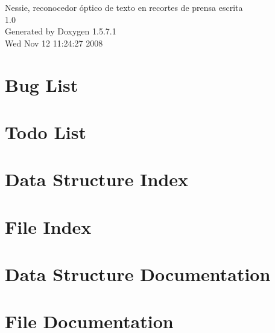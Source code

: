 \documentclass[a4paper]{article}
\begin{document}
\begin{titlepage}
\vspace*{7cm}
\begin{center}
{\Large Nessie, reconocedor óptico de texto en recortes de prensa escrita \\[1ex]\large 1.0 }\\
\vspace*{1cm}
{\large Generated by Doxygen 1.5.7.1}\\
\vspace*{0.5cm}
{\small Wed Nov 12 11:24:27 2008}\\
\end{center}
\end{titlepage}
\tableofcontents
{}
\section{Bug List}
\label{bug}
\hypertarget{bug}{}

\section{Todo List}
\label{todo}
\hypertarget{todo}{}

\section{Data Structure Index}

\section{File Index}

\section{Data Structure Documentation}












\section{File Documentation}

























\printindex
\end{document}
